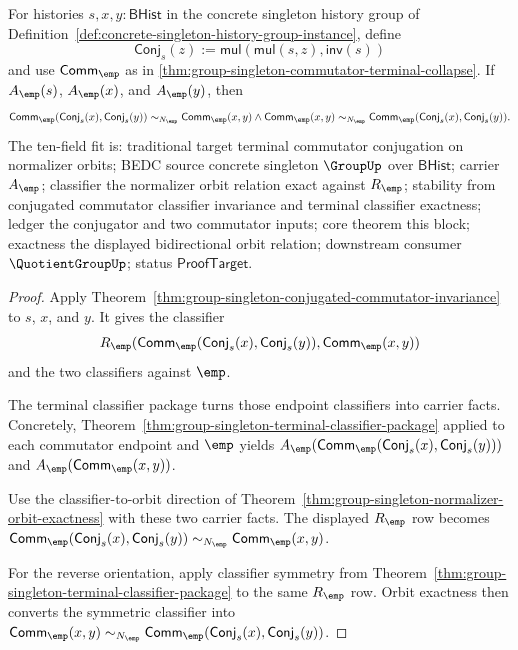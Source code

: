 \begin{theorem}
\label{thm:group-singleton-conjugated-commutator-orbit-invariance}
For histories $s,x,y:\mathsf{BHist}$ in the concrete singleton history group of
Definition~\ref{def:concrete-singleton-history-group-instance}, define
$$
\mathsf{Conj}_s(z):=\mathsf{mul}(\mathsf{mul}(s,z),\mathsf{inv}(s))
$$
and use $\mathsf{Comm}_{\emp}$ as in
\autoref{thm:group-singleton-commutator-terminal-collapse}. If
$A_{\emp}(s)$, $A_{\emp}(x)$, and $A_{\emp}(y)$, then
$$
\mathsf{Comm}_{\emp}(\mathsf{Conj}_s(x),\mathsf{Conj}_s(y))
\sim_{N_{\emp}}
\mathsf{Comm}_{\emp}(x,y)
\land
\mathsf{Comm}_{\emp}(x,y)
\sim_{N_{\emp}}
\mathsf{Comm}_{\emp}(\mathsf{Conj}_s(x),\mathsf{Conj}_s(y)).
$$
The ten-field fit is: traditional target terminal commutator conjugation on
normalizer orbits; BEDC source concrete singleton $\GroupUp$ over
$\mathsf{BHist}$; carrier $A_{\emp}$; classifier the normalizer orbit relation
exact against $R_{\emp}$; stability from conjugated commutator classifier
invariance and terminal classifier exactness; ledger the conjugator and two
commutator inputs; core theorem this block; exactness the displayed bidirectional
orbit relation; downstream consumer $\QuotientGroupUp$; status
$\mathsf{ProofTarget}$.
\end{theorem}
\begin{proof}
Apply Theorem~\ref{thm:group-singleton-conjugated-commutator-invariance} to
$s$, $x$, and $y$. It gives the classifier
$$
R_{\emp}(\mathsf{Comm}_{\emp}(\mathsf{Conj}_s(x),\mathsf{Conj}_s(y)),
\mathsf{Comm}_{\emp}(x,y))
$$
and the two classifiers against $\emp$.

The terminal classifier package turns those endpoint classifiers into carrier
facts. Concretely, Theorem~\ref{thm:group-singleton-terminal-classifier-package}
applied to each commutator endpoint and $\emp$ yields
$A_{\emp}(\mathsf{Comm}_{\emp}(\mathsf{Conj}_s(x),\mathsf{Conj}_s(y)))$ and
$A_{\emp}(\mathsf{Comm}_{\emp}(x,y))$.

Use the classifier-to-orbit direction of
Theorem~\ref{thm:group-singleton-normalizer-orbit-exactness} with these two
carrier facts. The displayed $R_{\emp}$ row becomes
$\mathsf{Comm}_{\emp}(\mathsf{Conj}_s(x),\mathsf{Conj}_s(y))\sim_{N_{\emp}}
\mathsf{Comm}_{\emp}(x,y)$.

For the reverse orientation, apply classifier symmetry from
Theorem~\ref{thm:group-singleton-terminal-classifier-package} to the same
$R_{\emp}$ row. Orbit exactness then converts the symmetric classifier into
$\mathsf{Comm}_{\emp}(x,y)\sim_{N_{\emp}}
\mathsf{Comm}_{\emp}(\mathsf{Conj}_s(x),\mathsf{Conj}_s(y))$.
\end{proof}
